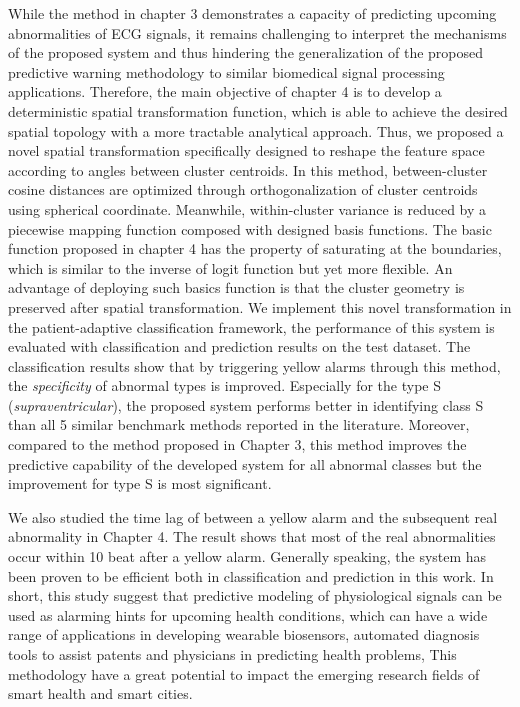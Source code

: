 While the method in chapter 3 demonstrates a capacity of predicting upcoming abnormalities of ECG signals, it remains challenging to interpret the mechanisms of the proposed system and thus hindering the generalization of the proposed predictive warning methodology to similar  biomedical signal processing applications. Therefore, the main objective of chapter 4 is to develop a deterministic spatial transformation function, which is able to achieve the desired spatial topology with a more tractable analytical approach. Thus, we proposed a novel spatial transformation specifically designed to reshape the feature space according to angles between cluster centroids. In this method, between-cluster cosine distances are optimized through orthogonalization of cluster centroids using spherical coordinate. Meanwhile, within-cluster variance is reduced by a piecewise mapping function composed with designed basis functions. The basic function proposed in chapter 4 has the property of saturating at the boundaries, which is similar to the inverse of logit function but yet more flexible. An advantage of deploying such basics function is that the cluster geometry is preserved after spatial transformation. 
We implement this novel transformation in the patient-adaptive classification framework, the performance of this system is evaluated with classification and prediction results on the test dataset. The classification results show that by triggering yellow alarms through this method, the \textit{specificity} of abnormal types is improved. Especially for the type S (\textit{supraventricular}), the proposed system performs better in identifying class S than all 5 similar benchmark methods reported in the literature.
Moreover, compared to the method proposed in Chapter 3, this method improves the predictive capability of the developed system for all abnormal classes but the improvement for type S is most significant. 

We also studied the time lag of between a yellow alarm and the subsequent real abnormality in Chapter 4. The result shows that most of the real abnormalities occur within 10 beat after a yellow alarm. Generally speaking, the system has been proven to be efficient both in classification and prediction in this work. In short, this study suggest that predictive modeling of physiological signals can be used as alarming hints for upcoming health conditions, which can have a wide range of applications in developing wearable biosensors,  automated diagnosis tools to assist patents and physicians in predicting health problems, This methodology have a great potential to impact the emerging research fields of smart health and smart cities.  


